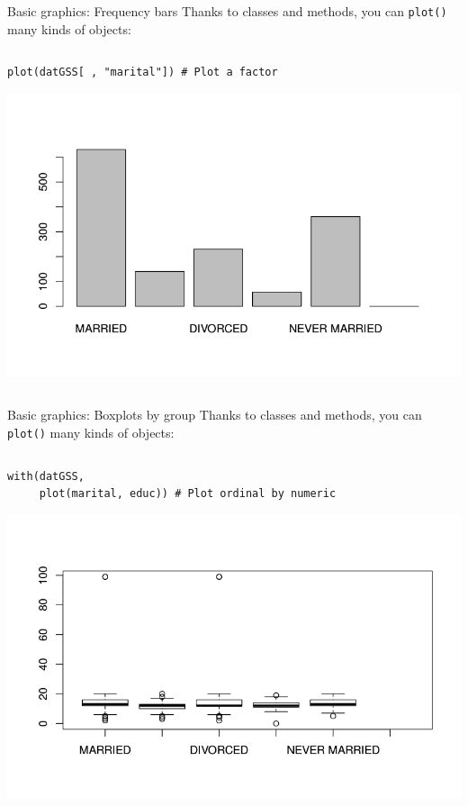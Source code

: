 \documentclass[table,smaller]{beamer}
\begin{document}
\begin{frame}[fragile,label=sec-6-7]{Basic graphics: Frequency bars}
 Thanks to classes and methods, you can \verb~plot()~ many  kinds of objects:

\begin{columns}  \begin{block}{}
\begin{verbatim}
plot(datGSS[ , "marital"]) # Plot a factor
\end{verbatim}
\includegraphics[width=.9\textwidth]{images/examplePlot1.png}



\end{block} \end{columns}
\end{frame}
\begin{frame}[fragile,label=sec-6-8]{Basic graphics: Boxplots by group}
 Thanks to classes and methods, you can \verb~plot()~ many kinds of objects:
\begin{columns}  \begin{block}{}
\begin{verbatim}
with(datGSS,
     plot(marital, educ)) # Plot ordinal by numeric
\end{verbatim}
\includegraphics[width=.9\textwidth]{images/examplePlot2.png}
\end{block} \end{columns}
\end{frame}
\end{document}
